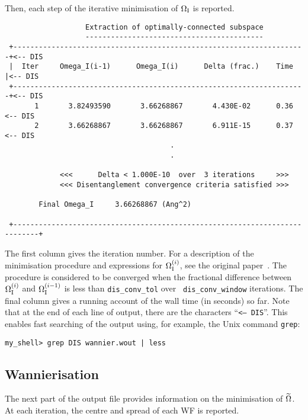 Then, each step of the iterative minimisation of $\Omega_{\mathrm{I}}$ is reported. 
\begin{verbatim}                                   
                   Extraction of optimally-connected subspace                  
                   ------------------------------------------                  
 +---------------------------------------------------------------------+<-- DIS
 |  Iter     Omega_I(i-1)      Omega_I(i)      Delta (frac.)    Time   |<-- DIS
 +---------------------------------------------------------------------+<-- DIS
       1       3.82493590       3.66268867       4.430E-02      0.36    <-- DIS
       2       3.66268867       3.66268867       6.911E-15      0.37    <-- DIS
                                       .
                                       .
                                   
             <<<      Delta < 1.000E-10  over  3 iterations     >>>
             <<< Disentanglement convergence criteria satisfied >>>

        Final Omega_I     3.66268867 (Ang^2)

 +----------------------------------------------------------------------------+
\end{verbatim}
The first column gives the iteration number. For a description of the
minimisation procedure and expressions for $\Omega_{\mathrm{I}}^{(i)}$, see the
original paper~\cite{souza-prb01}. The procedure is considered to be
converged when the fractional difference between $\Omega_{\mathrm{I}}^{(i)}$ and
$\Omega_{\mathrm{I}}^{(i-1)}$ is less than {\tt dis\_conv\_tol} over {\tt
  dis\_conv\_window} iterations. The final column gives a running
account of the wall time (in seconds) so far. Note that at the end of
each line of output, there are the characters ``{\tt <-- DIS}''. This
enables fast searching of the output using, for example, the Unix
command {\tt grep}:

{\tt my\_shell> grep DIS wannier.wout | less}

\subsection{Wannierisation}
\label{sec:files-wannierisation}

The next part of the output file provides information on the
minimisation of $\widetilde{\Omega}$. At each iteration, the centre and spread of
each WF is reported.

